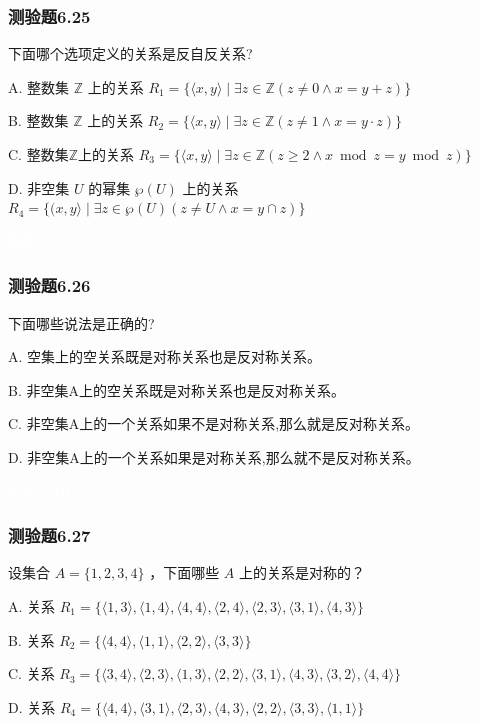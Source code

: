 \documentclass[UTF8, heading=true]{ctexart}
\begin{document}
\subsubsection{测验题6.25}
下面哪个选项定义的关系是反自反关系?

A. 整数集 $\mathbb{Z}$ 上的关系 $R_1=\{\langle x, y\rangle \mid \exists z \in \mathbb{Z}(z \neq 0 \wedge x=y+z)\}$

B. 整数集 $\mathbb{Z}$ 上的关系 $R_2=\{\langle x, y\rangle \mid \exists z \in \mathbb{Z}(z \neq 1 \wedge x=y \cdot z)\}$

C. 整数集$\mathbb{Z}$上的关系 $R_3=\{\langle x, y\rangle \mid \exists z \in \mathbb{Z}(z \geq 2 \wedge x \bmod z=y \bmod z)\}$

D. 非空集 $U$ 的幂集 $\wp(U)$ 上的关系 $R_4=\{(x, y\rangle \mid \exists z \in \wp(U)(z \neq U \wedge x=y \cap z)\}$

\textcolor{white}{答案：A}

\subsubsection{测验题6.26}

下面哪些说法是正确的?

A. 空集上的空关系既是对称关系也是反对称关系。

B. 非空集A上的空关系既是对称关系也是反对称关系。

C. 非空集A上的一个关系如果不是对称关系,那么就是反对称关系。

D. 非空集A上的一个关系如果是对称关系,那么就不是反对称关系。

\textcolor{white}{答案：AB}

\subsubsection{测验题6.27}

设集合 $A=\{1,2,3,4\}$ ，下面哪些 $A$ 上的关系是对称的？

A. 
关系 $R_1=\{\langle 1,3\rangle,\langle 1,4\rangle,\langle 4,4\rangle,\langle 2,4\rangle,\langle 2,3\rangle,\langle 3,1\rangle,\langle 4,3\rangle\}$

B. 
关系 $R_2=\{\langle 4,4\rangle,\langle 1,1\rangle,\langle 2,2\rangle,\langle 3,3\rangle\}$

C. 
关系 $R_3=\{\langle 3,4\rangle,\langle 2,3\rangle,\langle 1,3\rangle,\langle 2,2\rangle,\langle 3,1\rangle,\langle 4,3\rangle,\langle 3,2\rangle,\langle 4,4\rangle\}$

D.  
关系 $R_4=\{\langle 4,4\rangle,\langle 3,1\rangle,\langle 2,3\rangle,\langle 4,3\rangle,\langle 2,2\rangle,\langle 3,3\rangle,\langle 1,1\rangle\}$
\end{document}
